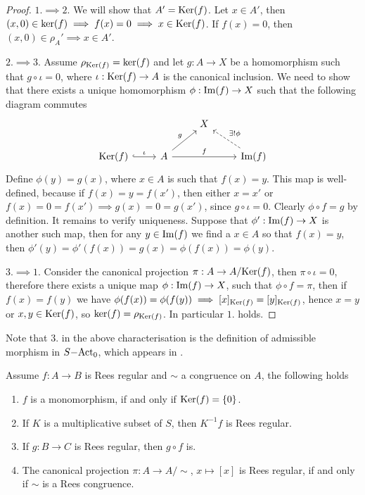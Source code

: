 \begin{proof}
    $1.\implies 2.$ We will show that $A'=\mathrm{Ker}(f)$. Let $x\in A'$, then $(x,0)\in\mathrm{ker}(f) \implies f(x)=0 \implies x \in\mathrm{Ker}(f)$. If $f(x)=0$, then 
    $(x,0)\in\rho_A' \implies x\in A'$. \par
    $2.\implies 3.$ Assume $\rho_{\mathrm{Ker}(f)} = \mathrm{ker}(f)$ and let $g: A\to X$ be a homomorphism such that $g\circ\iota = 0$, where
    $\iota: \mathrm{Ker}(f)\to A$ is the canonical inclusion. We need to show that there exists a unique homomorphism $\phi: \mathrm{Im}(f)\to X$ such that
    the following diagram commutes 
    \[\begin{tikzcd}
        && X \\
        {\Kernel{f}} & A && {\Image{f}}
        \arrow["\iota", hook, from=2-1, to=2-2]
        \arrow["g", from=2-2, to=1-3]
        \arrow["f", from=2-2, to=2-4]
        \arrow["{\exists ! \phi}"', dashed, from=2-4, to=1-3]
    \end{tikzcd}\]
    Define $\phi(y) = g(x)$, where $x\in A$ is such that $f(x)=y$. This map is well-defined, because if $f(x)=y=f(x')$, then
    either $x=x'$ or $f(x)=0=f(x') \implies g(x)=0=g(x')$, since $g\circ\iota = 0$. Clearly $\phi\circ f = g$ by definition.
    It remains to verify uniqueness. Suppose that $\phi': \mathrm{Im}(f)\to X$ is another such map, then for any $y\in\mathrm{Im}(f)$ we 
    find a $x\in A$ so that $f(x) = y$, then $\phi'(y) = \phi'(f(x)) = g(x) = \phi(f(x)) = \phi(y)$. \par
    $3. \implies 1.$ Consider the canonical projection $\pi : A \to A/\mathrm{Ker}(f)$, then $\pi\circ\iota = 0$, therefore 
    there exists a unique map $\phi: \mathrm{Im}(f)\to X$, such that $\phi\circ f = \pi$, then if $f(x)=f(y)$ we have 
    $\phi(f(x))=\phi(f(y)) \implies [x]_{\mathrm{Ker}(f)}=[y]_{\mathrm{Ker}(f)}$, hence $x=y$ or $x,y\in\mathrm{Ker}(f)$, so 
    $\mathrm{ker}(f)=\rho_{\mathrm{Ker}(f)}$. In particular $1.$ holds.
\end{proof}
\begin{remark}
    Note that $3.$ in the above characterisation is the definition of admissible morphism in $S\mathrm{-Act}_0$, 
    which appears in \cite{Flores15}.
\end{remark}
\begin{proposition}\label{regPropChar}
    Assume $f:A \to B$ is Rees regular and $\sim$ a congruence on $A$, the following holds
    \begin{enumerate}
        \item $f$ is a monomorphism, if and only if $\mathrm{Ker}(f) = \{0\}$.
        \item If $K$ is a multiplicative subset of $S$, then $K^{-1}f$ is Rees regular.
        \item If $g: B \to C$ is Rees regular, then $g\circ f$ is.
        \item The canonical projection $\pi : A \to A/\sim$, $x\mapsto [x]$ is Rees regular, if and only if 
        $\sim$ is a Rees congruence.
    \end{enumerate}
\end{proposition}
